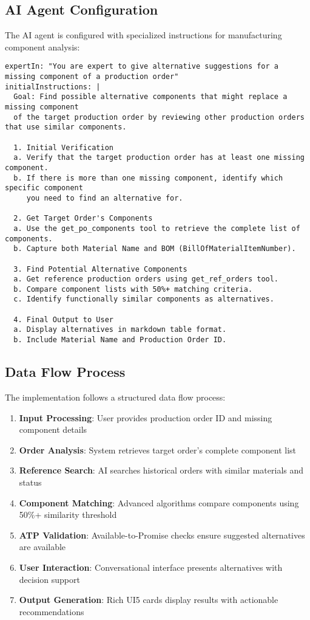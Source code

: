 \subsection{AI Agent Configuration}

The AI agent is configured with specialized instructions for manufacturing component analysis:

\begin{verbatim}
expertIn: "You are expert to give alternative suggestions for a missing component of a production order"
initialInstructions: |
  Goal: Find possible alternative components that might replace a missing component 
  of the target production order by reviewing other production orders that use similar components.
  
  1. Initial Verification
  a. Verify that the target production order has at least one missing component.
  b. If there is more than one missing component, identify which specific component 
     you need to find an alternative for.
  
  2. Get Target Order's Components
  a. Use the get_po_components tool to retrieve the complete list of components.
  b. Capture both Material Name and BOM (BillOfMaterialItemNumber).
  
  3. Find Potential Alternative Components
  a. Get reference production orders using get_ref_orders tool.
  b. Compare component lists with 50%+ matching criteria.
  c. Identify functionally similar components as alternatives.
  
  4. Final Output to User
  a. Display alternatives in markdown table format.
  b. Include Material Name and Production Order ID.
\end{verbatim}

\subsection{Data Flow Process}

The implementation follows a structured data flow process:

\begin{enumerate}
    \item \textbf{Input Processing}: User provides production order ID and missing component details
    \item \textbf{Order Analysis}: System retrieves target order's complete component list
    \item \textbf{Reference Search}: AI searches historical orders with similar materials and status
    \item \textbf{Component Matching}: Advanced algorithms compare components using 50\%+ similarity threshold
    \item \textbf{ATP Validation}: Available-to-Promise checks ensure suggested alternatives are available
    \item \textbf{User Interaction}: Conversational interface presents alternatives with decision support
    \item \textbf{Output Generation}: Rich UI5 cards display results with actionable recommendations
\end{enumerate}

